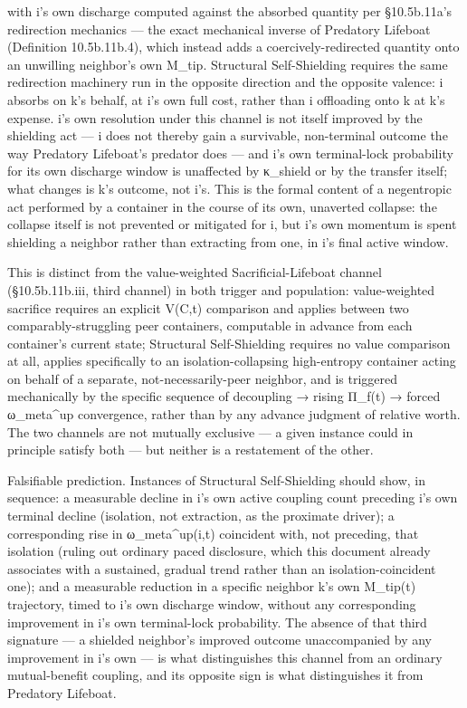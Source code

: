 \documentclass[
]{article}
\begin{document}
with i's own discharge computed against the absorbed quantity per
§10.5b.11a's redirection mechanics --- the exact mechanical inverse of
Predatory Lifeboat (Definition 10.5b.11b.4), which instead adds a
coercively-redirected quantity onto an unwilling neighbor's own M\_tip.
Structural Self-Shielding requires the same redirection machinery run in
the opposite direction and the opposite valence: i absorbs on k's
behalf, at i's own full cost, rather than i offloading onto k at k's
expense. i's own resolution under this channel is not itself improved by
the shielding act --- i does not thereby gain a survivable, non-terminal
outcome the way Predatory Lifeboat's predator does --- and i's own
terminal-lock probability for its own discharge window is unaffected by
κ\_shield or by the transfer itself; what changes is k's outcome, not
i's. This is the formal content of a negentropic act performed by a
container in the course of its own, unaverted collapse: the collapse
itself is not prevented or mitigated for i, but i's own momentum is
spent shielding a neighbor rather than extracting from one, in i's final
active window.

This is distinct from the value-weighted Sacrificial-Lifeboat channel
(§10.5b.11b.iii, third channel) in both trigger and population:
value-weighted sacrifice requires an explicit V(C,t) comparison and
applies between two comparably-struggling peer containers, computable in
advance from each container's current state; Structural Self-Shielding
requires no value comparison at all, applies specifically to an
isolation-collapsing high-entropy container acting on behalf of a
separate, not-necessarily-peer neighbor, and is triggered mechanically
by the specific sequence of decoupling → rising Π\_f(t) → forced
ω\_meta\^{}up convergence, rather than by any advance judgment of
relative worth. The two channels are not mutually exclusive --- a given
instance could in principle satisfy both --- but neither is a
restatement of the other.

Falsifiable prediction. Instances of Structural Self-Shielding should
show, in sequence: a measurable decline in i's own active coupling count
preceding i's own terminal decline (isolation, not extraction, as the
proximate driver); a corresponding rise in ω\_meta\^{}up(i,t) coincident
with, not preceding, that isolation (ruling out ordinary paced
disclosure, which this document already associates with a sustained,
gradual trend rather than an isolation-coincident one); and a measurable
reduction in a specific neighbor k's own M\_tip(t) trajectory, timed to
i's own discharge window, without any corresponding improvement in i's
own terminal-lock probability. The absence of that third signature --- a
shielded neighbor's improved outcome unaccompanied by any improvement in
i's own --- is what distinguishes this channel from an ordinary
mutual-benefit coupling, and its opposite sign is what distinguishes it
from Predatory Lifeboat.
\end{document}
